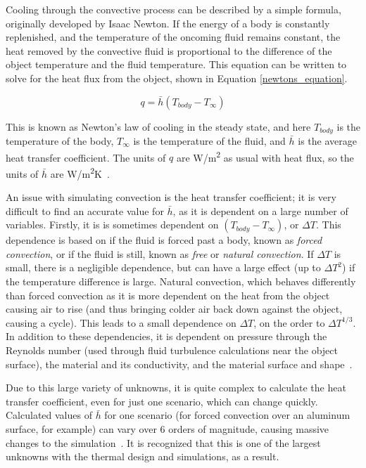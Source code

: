 Cooling through the convective process can be described by a simple formula, originally developed by Isaac Newton. If the energy of a body is constantly replenished, and the temperature of the oncoming fluid remains constant, the heat removed by the convective fluid is proportional to the difference of the object temperature and the fluid temperature. This equation can be written to solve for the heat flux from the object, shown in Equation \ref{newtons_equation}.

\begin{equation}\label{newtons_equation}
    q = \bar{h}(T_{body} - T_{\infty})
\end{equation}

This is known as Newton's law of cooling in the steady state, and here $T_{body}$ is the temperature of the body, $T_{\infty}$ is the temperature of the fluid, and $\bar{h}$ is the average heat transfer coefficient. The units of $q$ are W/m\textsuperscript{2} as usual with heat flux, so the units of $\bar{h}$ are W/m\textsuperscript{2}K~\citep{heat_transfer_textbook}.

An issue with simulating convection is the heat transfer coefficient; it is very difficult to find an accurate value for $\bar{h}$, as it is dependent on a large number of variables. Firstly, it is is sometimes dependent on $(T_{body} - T_{\infty})$, or $\Delta T$. This dependence is based on if the fluid is forced past a body, known as \textit{forced convection}, or if the fluid is still, known as \textit{free} or \textit{natural convection}. If $\Delta T$ is small, there is a negligible dependence, but can have a large effect (up to $\Delta T^2$) if the temperature difference is large. Natural convection, which behaves differently than forced convection as it is more dependent on the heat from the object causing air to rise (and thus bringing colder air back down against the object, causing a cycle). This leads to a small dependence on $\Delta T$, on the order to $\Delta T^{1/3}$. In addition to these dependencies, it is dependent on pressure through the Reynolds number (used through fluid turbulence calculations near the object surface), the material and its conductivity, and the material surface and shape~\citep{heat_transfer_textbook}.

Due to this large variety of unknowns, it is quite complex to calculate the heat transfer coefficient, even for just one scenario, which can change quickly. Calculated values of $\bar{h}$ for one scenario (for forced convection over an aluminum surface, for example) can vary over 6 orders of magnitude, causing massive changes to the simulation~\citep{heat_transfer_textbook}. It is recognized that this is one of the largest unknowns with the thermal design and simulations, as a result.

